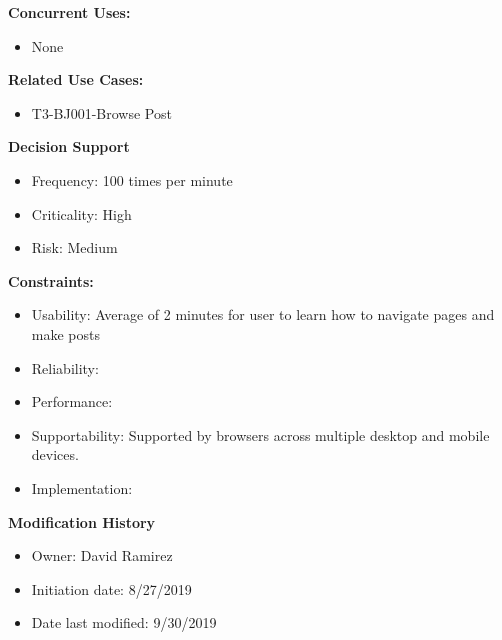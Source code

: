 \textbf{Concurrent Uses:}
\begin{itemize}
    \item None
\end{itemize}
\textbf{Related Use Cases:}
\begin{itemize}
    \item T3-BJ001-Browse Post
\end{itemize}
\textbf{Decision Support}
\begin{itemize}
    \item Frequency: 100 times per minute
    \item Criticality: High
    \item Risk: Medium
\end{itemize}
\textbf{Constraints:}
\begin{itemize}
    \item Usability: Average of 2 minutes for user to learn how to navigate pages and make posts
    \item Reliability:
    \item Performance:
    \item Supportability: Supported by browsers across multiple desktop and mobile devices.
    \item Implementation:
\end{itemize}
\textbf{Modification History}
\begin{itemize}
    \item Owner: David Ramirez
    \item Initiation date: 8/27/2019
    \item Date last modified: 9/30/2019
\end{itemize}